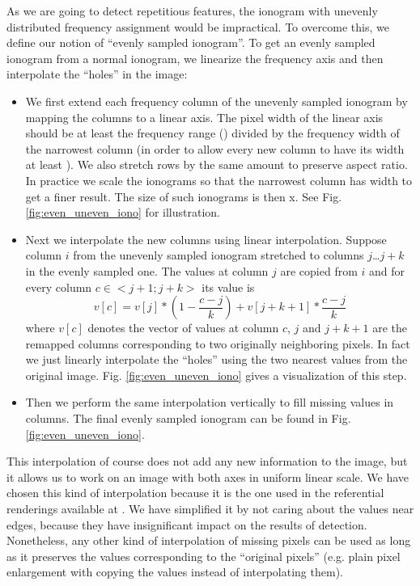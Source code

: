 As we are going to detect repetitious features, the ionogram with unevenly distributed frequency assignment would be impractical. To overcome this, we define our notion of ``evenly sampled ionogram''. To get an evenly sampled ionogram from a normal ionogram, we linearize the frequency axis and then interpolate the ``holes'' in the image:

\begin{itemize}
  \item We first extend each frequency column of the unevenly sampled ionogram by mapping the columns to a linear axis. The pixel width of the linear axis should be at least the frequency range () divided by the frequency width of the narrowest column (in order to allow every new column to have its width at least ). We also stretch rows by the same amount to preserve aspect ratio. In practice we scale the ionograms so that the narrowest column has width  to get a finer result. The size of such ionograms is then x. See Fig. \ref{fig:even_uneven_iono} for illustration.
  \item Next we interpolate the new columns using linear interpolation. Suppose column $i$ from the unevenly sampled ionogram stretched to columns $j$\ldots$j+k$ in the evenly sampled one. The values at column $j$ are copied from $i$ and for every column $c\in<j+1; j+k>$ its value is $$v[c] = v[j]*(1-\frac{c-j}{k}) + v[j+k+1]*\frac{c-j}{k}$$ where $v[c]$ denotes the vector of values at column $c$, $j$ and $j+k+1$ are the remapped columns corresponding to two originally neighboring pixels. In fact we just linearly interpolate the ``holes'' using the two nearest values from the original image. Fig. \ref{fig:even_uneven_iono} gives a visualization of this step. 
  \item Then we perform the same interpolation vertically to fill missing values in columns. The final evenly sampled ionogram can be found in Fig. \ref{fig:even_uneven_iono}.
\end{itemize}

This interpolation of course does not add any new information to the image, but it allows us to work on an image with both axes in uniform linear scale. We have chosen this kind of interpolation because it is the one used in the referential renderings available at \citep{FTP}. We have simplified it by not caring about the values near edges, because they have insignificant impact on the results of detection. Nonetheless, any other kind of interpolation of missing pixels can be used as long as it preserves the values corresponding to the ``original pixels'' (e.g. plain pixel enlargement with copying the values instead of interpolating them).

